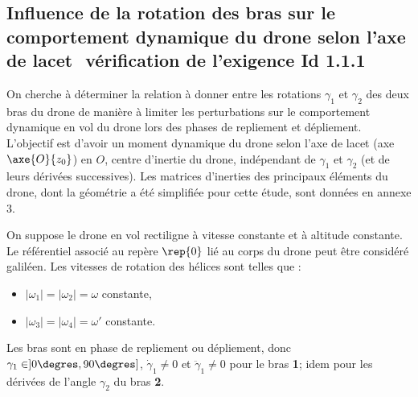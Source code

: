 \subsection{Influence de la rotation des bras sur le comportement dynamique du drone selon
l’axe de lacet ­ vérification de l’exigence Id 1.1.1}

On cherche à déterminer la relation à donner entre les rotations $\gamma_1$ et $\gamma_2$ des deux bras du
drone de manière à limiter les perturbations sur le comportement dynamique en vol du drone
lors des phases de repliement et dépliement. L’objectif est d’avoir un moment dynamique du
drone selon l’axe de lacet (axe $\axe{O}{z_0}$) en $O$, centre d’inertie du drone, indépendant de $\gamma_1$
et $\gamma_2$ (et de leurs dérivées successives). Les matrices d’inerties des principaux éléments du
drone, dont la géométrie a été simplifiée pour cette étude, sont données en annexe 3.

\begin{hypo}
On suppose le drone en vol rectiligne à vitesse constante et à altitude constante. Le référentiel associé au repère $\rep{0}$ lié au corps du drone peut être considéré galiléen.
Les vitesses de rotation des hélices sont telles que :
\begin{itemize}
\item $|\omega_1|=|\omega_2|=\omega$ constante,
\item $|\omega_3|=|\omega_4|=\omega'$ constante.
\end{itemize}
Les bras sont en phase de repliement ou dépliement, 
donc $\gamma_1 \in ]0\degres, 90\degres]$, 
$\dot{\gamma}_1 \neq 0$ et  $\ddot{\gamma}_1 \neq 0$ pour le bras \textbf{1};
idem pour les dérivées de l’angle $\gamma_2$ du bras \textbf{2}.
\end{hypo}



\ifprof
\begin{corrige}
\end{corrige}
\else
\fi


\ifprof
\begin{corrige}
\end{corrige}
\else
\fi


